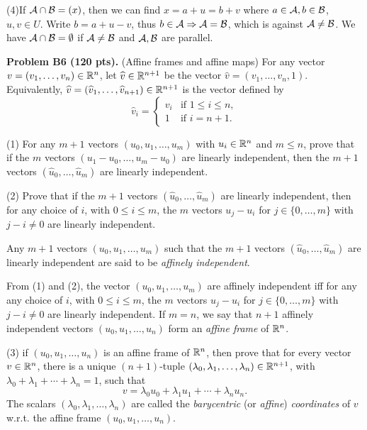 \documentclass[12pt]{article}
\begin{document}
\medskip
(4)If ${\cal A}\cap {\cal B} = (x)$, then we can find $x = a + u = b + v$ where $a \in {\cal A}, b \in {\cal B}$, $u, v \in U$. Write $b = a + u - v$, thus $b \in {\cal A} \Rightarrow {\cal A} = {\cal B}$, which is against ${\cal A} \neq {\cal B}$. We have ${\cal A} \cap {\cal B} = \emptyset$ if ${\cal A} \neq {\cal B}$ and ${\cal A}, {\cal B}$ are parallel. 

\vspace {0.25cm}\noindent
{\bf Problem B6 (120 pts).} (Affine frames and affine maps)
For any vector $v = (v_1, \ldots, v_n) \in \mathbb{R}^n$, let 
$\widehat{v}\in \mathbb{R}^{n+1}$ be the vector 
$\widehat{v} = (v_1, \ldots, v_n,1)$. 
Equivalently, 
$\widehat{v} = (\widehat{v}_1, \ldots, \widehat{v}_{n+1})\in \mathbb{R}^{n+1}$
is the vector defined by
\[
\widehat{v}_i=
\begin{cases}
v_i & \text{if $1\leq i \leq n$}, \\
1 & \text{if $i = n + 1$}.
\end{cases}
\]

(1)
For any $m + 1$ vectors $(u_0, u_1, \ldots, u_{m })$ 
with $u_i \in \mathbb{R}^n$  and  $m \leq n$, prove that
if the $m$ vectors $(u_1 - u_0, \ldots, u_m - u_0)$ are linearly
independent, then the $m + 1$ vectors
$(\widehat{u}_0, \ldots,  \widehat{u}_m)$ are linearly independent.

\medskip
(2) Prove that if  the $m + 1$ vectors
$(\widehat{u}_0,  \ldots,  \widehat{u}_m)$ are linearly independent,
then
for any choice of $i$, with $0 \leq i \leq m$, the
$m$ vectors $u_j - u_i$  for $j \in \{0, \ldots, m\}$ with $j - i \not = 0$
are linearly independent.

\medskip
Any $m + 1$ vectors  $(u_0, u_1, \ldots, u_{m })$ such that
the  $m + 1$ vectors
$(\widehat{u}_0, \ldots,  \widehat{u}_m)$ are linearly independent
are said to be {\it affinely independent\/}.

\medskip
From (1) and (2), the vector $(u_0, u_1, \ldots, u_{m })$ 
are affinely independent iff
for any  any choice of $i$, with $0 \leq i \leq m$, the
$m$ vectors $u_j - u_i$  for $j \in \{0, \ldots, m\}$ with $j - i \not = 0$
are linearly independent.
If $m = n$,  we say that $n + 1$ affinely independent 
vectors  $(u_0, u_1, \ldots, u_{n })$ form an {\it affine frame\/} of $\mathbb{R}^n$. 

\medskip
(3) if $(u_0, u_1, \ldots, u_{n })$ is an affine frame of $\mathbb{R}^n$,
then prove that for every vector $v\in \mathbb{R}^n$,  
there is a unique $(n + 1)$-tuple
$(\lambda_0, \lambda_1, \ldots, \lambda_n)\in \mathbb{R}^{n + 1}$, with
$\lambda_0 + \lambda_1 + \cdots + \lambda_n = 1$, such that
\[
v = \lambda_0 u_0 + \lambda_1 u_1 + \cdots + \lambda_n u_n.
\]
The scalars $(\lambda_0, \lambda_1, \ldots, \lambda_n)$ are called the
{\it barycentric\/} (or {\it affine\/}) {\it coordinates\/} of $v$
w.r.t. the affine frame   $(u_0, u_1, \ldots, u_{n })$.
\end{document}
